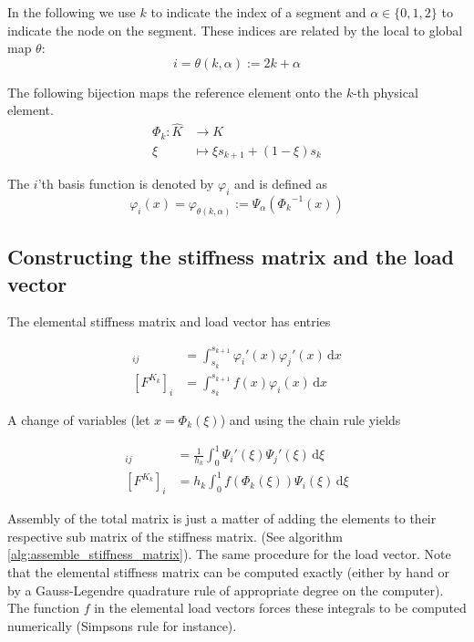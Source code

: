 In the following we use \( k \) to indicate the index
of a segment and \( \alpha \in \{  0, 1, 2  \} \) to indicate
the node on the segment. These indices are related by the
local to global map \( \theta \):
\begin{equation}
  \label{eq:loc2glob}
  i = \theta(k, \alpha) := 2k + \alpha    
\end{equation}

The following bijection maps the reference element onto
the \( k \)-th physical element.
\begin{align}
  \Phi_k : \hat{K} &\longrightarrow  K \\
  \xi & \longmapsto \xi s_{k+1} + (1-\xi) s_{k}
\end{align}

The \( i \)'th basis function is denoted by \( \varphi_i \)
and is defined as
\begin{equation}
  \varphi_i(x) = \varphi_{\theta(k, \alpha)} := \Psi_{\alpha}({{\Phi_k}^{-1}(x) })
\end{equation}

\subsection{Constructing the stiffness matrix and the load vector}

The elemental stiffness matrix and load vector has entries

\begin{align}
  [A^{K_k}]_{ij}
    &=  \int_{s_k}^{s_{k+1}} \varphi_i'(x) \varphi_j'(x) \,\mathrm{d}x\\
  [F^{K_k}]_i
    &= \int_{s_k}^{s_{k+1}} f\left(x\right) \varphi_i\left(x\right) \,\mathrm{d}x
\end{align}

A change of variables (let \( x = \Phi_k(\xi) \)) and using the chain rule yields

\begin{align}
  [A^{K_k}]_{ij}
    &= \frac{1}{h_k} \int_{0}^{1} \Psi_i'(\xi)\Psi_j'(\xi) \,\mathrm{d}\xi \\
  [F^{K_k}]_i
    &= h_k \int_{0}^{1} f\left(\Phi_k\left(\xi\right)\right) \Psi_i\left(\xi\right) \,\mathrm{d}\xi
\end{align}

Assembly of the total matrix is just a matter of
adding the elements to their respective sub matrix
of the stiffness matrix. (See algorithm \ref{alg:assemble_stiffness_matrix}).
The same procedure for the load vector.
Note that the elemental stiffness matrix
can be computed exactly (either by hand or by a Gauss-Legendre quadrature rule of appropriate
degree on the computer). The function \( f \) in the elemental load vectors
forces these integrals to be computed numerically (Simpsons rule for instance).

